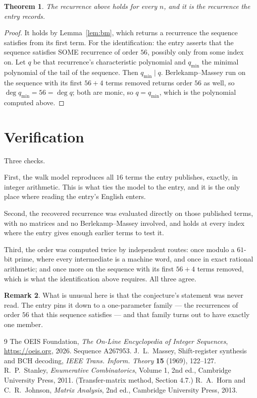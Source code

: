 \documentclass[11pt,a4paper]{article}
\theoremstyle{plain}
\newtheorem{theorem}{Theorem}
\theoremstyle{definition}
\newtheorem{remark}[theorem]{Remark}
\begin{document}
\begin{theorem}
The recurrence above holds for every $n$, and it is the recurrence the entry records.
\end{theorem}

\begin{proof}
It holds by Lemma~\ref{lem:bm}, which returns a recurrence the sequence satisfies from its
first term. For the identification: the entry asserts that the sequence satisfies SOME
recurrence of order $56$, possibly only from some index on. Let $q$ be that recurrence's
characteristic polynomial and $q_{\min}$ the minimal polynomial of the tail of the sequence.
Then $q_{\min}\mid q$. Berlekamp--Massey run on the sequence with its first $56+4$ terms
removed returns order $56$ as well, so $\deg q_{\min}=56=\deg q$; both are monic, so
$q=q_{\min}$, which is the polynomial computed above.
\end{proof}

\section{Verification}

Three checks.

First, the walk model reproduces all $16$ terms the entry publishes, exactly, in integer
arithmetic. This is what ties the model to the entry, and it is the only place where reading
the entry's English enters.

Second, the recovered recurrence was evaluated directly on those published terms, with no
matrices and no Berlekamp--Massey involved, and holds at every index where the entry gives
enough earlier terms to test it.

Third, the order was computed twice by independent routes: once modulo a $61$-bit prime, where
every intermediate is a machine word, and once in exact rational arithmetic; and once more on
the sequence with its first $56+4$ terms removed, which is what the identification above
requires. All three agree.

\begin{remark}
What is unusual here is that the conjecture's statement was never read. The entry pins it down
to a one-parameter family --- the recurrences of order $56$ that this sequence satisfies
--- and that family turns out to have exactly one member.
\end{remark}

\begin{thebibliography}{9}
 The OEIS Foundation, \emph{The On-Line Encyclopedia of Integer
Sequences}, \url{https://oeis.org}, 2026. Sequence A267953.
 J.~L.~Massey, Shift-register synthesis and BCH decoding, \emph{IEEE
Trans. Inform. Theory} \textbf{15} (1969), 122--127.
 R.~P.~Stanley, \emph{Enumerative Combinatorics}, Volume 1, 2nd ed.,
Cambridge University Press, 2011. (Transfer-matrix method, Section 4.7.)
 R.~A.~Horn and C.~R.~Johnson, \emph{Matrix Analysis}, 2nd ed., Cambridge
University Press, 2013.
\end{thebibliography}
\end{document}
